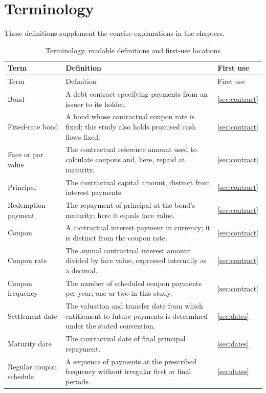 \chapter*{Terminology}
\noindent These definitions supplement the concise explanations in the chapters.
\begingroup\small\singlespacing
\setlength{\tabcolsep}{4pt}
\begin{longtable}{@{}L{0.22\textwidth}L{0.58\textwidth}L{0.12\textwidth}@{}}
\caption{Terminology, readable definitions and first-use locations}\label{tab:glossary}\\
\toprule Term & Definition & First use\\ \midrule
\endfirsthead
\toprule Term & Definition & First use\\ \midrule
\endhead
\bottomrule\endfoot
Bond & A debt contract specifying payments from an issuer to its holder. & \ref{sec:contract}\\
Fixed-rate bond & A bond whose contractual coupon rate is fixed; this study also holds promised cash flows fixed. & \ref{sec:contract}\\
Face or par value & The contractual reference amount used to calculate coupons and, here, repaid at maturity. & \ref{sec:contract}\\
Principal & The contractual capital amount, distinct from interest payments. & \ref{sec:contract}\\
Redemption payment & The repayment of principal at the bond's maturity; here it equals face value. & \ref{sec:contract}\\
Coupon & A contractual interest payment in currency; it is distinct from the coupon rate. & \ref{sec:contract}\\
Coupon rate & The annual contractual interest amount divided by face value, expressed internally as a decimal. & \ref{sec:contract}\\
Coupon frequency & The number of scheduled coupon payments per year; one or two in this study. & \ref{sec:contract}\\
Settlement date & The valuation and transfer date from which entitlement to future payments is determined under the stated convention. & \ref{sec:dates}\\
Maturity date & The contractual date of final principal repayment. & \ref{sec:dates}\\
Regular coupon schedule & A sequence of payments at the prescribed frequency without irregular first or final periods. & \ref{sec:dates}\\

\end{longtable}
